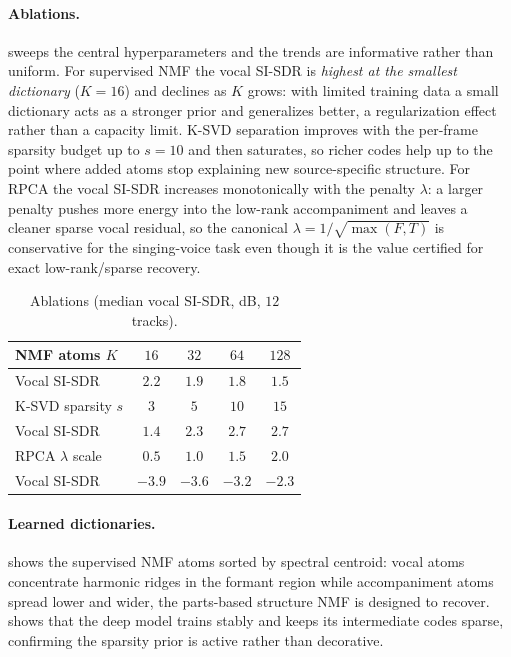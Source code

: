 \documentclass{article}
\newcommand{\ABLnmfA}{$2.2$} \newcommand{\ABLnmfB}{$1.9$}
\newcommand{\ABLnmfC}{$1.8$} \newcommand{\ABLnmfD}{$1.5$}
\newcommand{\ABLksvdA}{$1.4$} \newcommand{\ABLksvdB}{$2.3$}
\newcommand{\ABLksvdC}{$\mathbf{2.7}$} \newcommand{\ABLksvdD}{$2.7$}
\newcommand{\ABLrpcaA}{$-3.9$} \newcommand{\ABLrpcaB}{$-3.6$}
\newcommand{\ABLrpcaC}{$-3.2$} \newcommand{\ABLrpcaD}{$\mathbf{-2.3}$}
\begin{document}
\paragraph{Ablations.}
 sweeps the central hyperparameters and the trends are informative
rather than uniform. For supervised NMF the vocal SI-SDR is \emph{highest at the
smallest dictionary} ($K{=}16$) and declines as $K$ grows: with limited training
data a small dictionary acts as a stronger prior and generalizes better, a
regularization effect rather than a capacity limit. K-SVD separation improves with
the per-frame sparsity budget up to $s{=}10$ and then saturates, so richer codes
help up to the point where added atoms stop explaining new source-specific
structure. For RPCA the vocal SI-SDR increases monotonically with the penalty
$\lambda$: a larger penalty pushes more energy into the low-rank accompaniment and
leaves a cleaner sparse vocal residual, so the canonical
$\lambda{=}1/\sqrt{\max(F,T)}$ is conservative for the singing-voice task even
though it is the value certified for exact low-rank/sparse recovery.

\begin{table}[t]
\caption{Ablations (median vocal SI-SDR, dB, $12$ tracks).}
\label{tab:abl}
\centering
\small
\begin{tabular}{@{}lcccc@{}}
\toprule
NMF atoms $K$        & $16$ & $32$ & $64$ & $128$ \\
\midrule
Vocal SI-SDR         & \ABLnmfA & \ABLnmfB & \ABLnmfC & \ABLnmfD \\
\midrule[\heavyrulewidth]
K-SVD sparsity $s$   & $3$ & $5$ & $10$ & $15$ \\
\midrule
Vocal SI-SDR         & \ABLksvdA & \ABLksvdB & \ABLksvdC & \ABLksvdD \\
\midrule[\heavyrulewidth]
RPCA $\lambda$ scale & $0.5$ & $1.0$ & $1.5$ & $2.0$ \\
\midrule
Vocal SI-SDR         & \ABLrpcaA & \ABLrpcaB & \ABLrpcaC & \ABLrpcaD \\
\bottomrule
\end{tabular}
\end{table}

\paragraph{Learned dictionaries.}
 shows the supervised NMF atoms sorted by spectral centroid: vocal
atoms concentrate harmonic ridges in the formant region while accompaniment atoms
spread lower and wider, the parts-based structure NMF is designed to recover.
 shows that the deep model trains stably and keeps its intermediate
codes sparse, confirming the sparsity prior is active rather than decorative.
\end{document}
